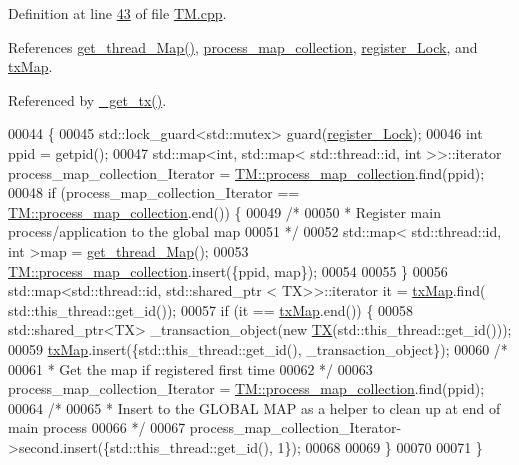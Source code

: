 Definition at line \hyperlink{_t_m_8cpp_source_l00043}{43} of file \hyperlink{_t_m_8cpp_source}{T\+M.\+cpp}.



References \hyperlink{_t_m_8cpp_source_l00134}{get\+\_\+thread\+\_\+\+Map()}, \hyperlink{_t_m_8h_source_l00047}{process\+\_\+map\+\_\+collection}, \hyperlink{_t_m_8h_source_l00059}{register\+\_\+\+Lock}, and \hyperlink{_t_m_8h_source_l00042}{tx\+Map}.



Referenced by \hyperlink{_t_m_8cpp_source_l00079}{\+\_\+get\+\_\+tx()}.


\begin{DoxyCode}
00044 \{
00045     std::lock\_guard<std::mutex> guard(\hyperlink{class_t_m_aeb26546681bfe64e21606b8c012bb8c3_aeb26546681bfe64e21606b8c012bb8c3}{register\_Lock});
00046     \textcolor{keywordtype}{int} ppid = getpid();
00047     std::map<int, std::map< std::thread::id, int >>::iterator process\_map\_collection\_Iterator = 
      \hyperlink{class_t_m_a81c3bd28ad2343a620fa070f8ac186ca_a81c3bd28ad2343a620fa070f8ac186ca}{TM::process\_map\_collection}.find(ppid);
00048     \textcolor{keywordflow}{if} (process\_map\_collection\_Iterator == \hyperlink{class_t_m_a81c3bd28ad2343a620fa070f8ac186ca_a81c3bd28ad2343a620fa070f8ac186ca}{TM::process\_map\_collection}.end()) \{
00049         \textcolor{comment}{/*}
00050 \textcolor{comment}{         * Register main process/application to the global map
}
00051 \textcolor{comment}{         */}
00052         std::map< std::thread::id, int >map = \hyperlink{class_t_m_afb8bc9f42fe06c52747beb7f4c46915c_afb8bc9f42fe06c52747beb7f4c46915c}{get\_thread\_Map}();
00053         \hyperlink{class_t_m_a81c3bd28ad2343a620fa070f8ac186ca_a81c3bd28ad2343a620fa070f8ac186ca}{TM::process\_map\_collection}.insert(\{ppid, map\});
00054 
00055     \}
00056     std::map<std::thread::id, std::shared\_ptr < TX>>::iterator it = \hyperlink{class_t_m_a0333dfa193ea99d7626de74a2b932e9b_a0333dfa193ea99d7626de74a2b932e9b}{txMap}.find(
      std::this\_thread::get\_id());
00057     \textcolor{keywordflow}{if} (it == \hyperlink{class_t_m_a0333dfa193ea99d7626de74a2b932e9b_a0333dfa193ea99d7626de74a2b932e9b}{txMap}.end()) \{
00058         std::shared\_ptr<TX> \_transaction\_object(\textcolor{keyword}{new} \hyperlink{class_t_x}{TX}(std::this\_thread::get\_id()));
00059         \hyperlink{class_t_m_a0333dfa193ea99d7626de74a2b932e9b_a0333dfa193ea99d7626de74a2b932e9b}{txMap}.insert(\{std::this\_thread::get\_id(), \_transaction\_object\});
00060         \textcolor{comment}{/*}
00061 \textcolor{comment}{         * Get the map if registered first time
}
00062 \textcolor{comment}{         */}
00063         process\_map\_collection\_Iterator = \hyperlink{class_t_m_a81c3bd28ad2343a620fa070f8ac186ca_a81c3bd28ad2343a620fa070f8ac186ca}{TM::process\_map\_collection}.find(ppid);
00064         \textcolor{comment}{/*}
00065 \textcolor{comment}{         * Insert to the GLOBAL MAP as a helper to clean up at end of main process 
}
00066 \textcolor{comment}{         */}
00067         process\_map\_collection\_Iterator->second.insert(\{std::this\_thread::get\_id(), 1\});
00068 
00069     \}
00070 
00071 \}
\end{DoxyCode}


